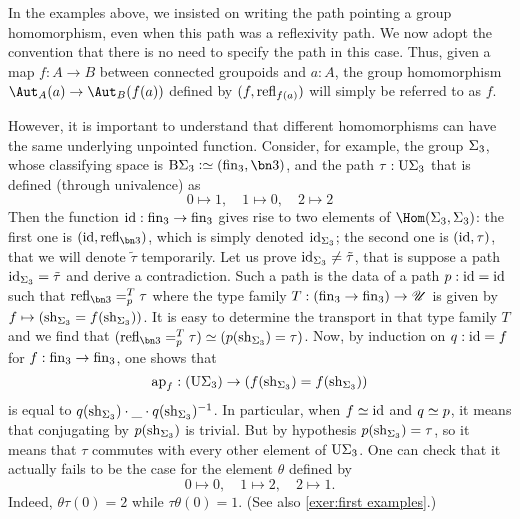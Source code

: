 \begin{remark}
  In the examples above, we insisted on writing the path pointing a group
  homomorphism, even when this path was a reflexivity path. We now adopt
  the convention that there is no need to specify the path in this case. Thus, given a
  map $f:A \to B$ between connected groupoids and $a:A$, the group
  homomorphism $\Aut_A(a) \to \Aut_B(f(a))$ defined by
  $(f,\mathrm{refl}_{f(a)})$ will simply be referred to as $f$.

  However, it is important to understand that different homomorphisms
  can have the same underlying unpointed function. Consider, for
  example, the group $\Sigma_{{3}}$, whose classifying space is
  $\clf \permgrp 3\defequi (\fin_3,\bn 3)$, and the path
  $\tau:\mathrm{U}{\Sigma_{{3}}}$ that is defined (through
  univalence) as
  \begin{displaymath}
    0\mapsto 1,\quad 1\mapsto 0,\quad 2 \mapsto 2
  \end{displaymath}
  Then the function $\id: \fin_3 \to \fin_3$ gives rise to two
  elements of $\Hom(\permgrp 3,\permgrp 3)$: the first one is
  $(\id,\refl{\bn 3})$, which is simply denoted $\mathord{\mathrm{id}}_{\Sigma_{{3}}}$;
  the second one is $(\mathord{\mathrm{id}},\tau)$, that we will denote $\tilde\tau$
  temporarily. Let us prove $\mathord{\mathrm{id}}_{\Sigma_{{3}}} \neq \tilde \tau$, that
  is suppose a path $\mathord{\mathrm{id}}_{\Sigma_{{3}}}= \tilde \tau$ and derive a
  contradiction. Such a path is the data of a path $p:\mathord{\mathrm{id}} = \mathord{\mathrm{id}}$ such
  that $\pathover {\refl{\bn 3}} {T} {p} \tau$ where the type family
  $T:(\fin_3\to\fin_3) \to \UU$ is given by
  $f\mapsto (\mathrm{sh}_{\Sigma_{{3}}} = f(\mathrm{sh}_{\Sigma_{{3}}}))$. It is easy to
  determine the transport in that type family $T$ and we find that
  $(\pathover {\refl{\bn 3}} {T} {p} \tau) \weq (p(\shape_{\permgrp
    3})=\tau)$. Now, by induction on $q:\mathord{\mathrm{id}}=f$ for
  $f:\fin_3 \to \fin_3$, one shows that
  \begin{displaymath}
    \ap f : (\USym{\permgrp 3}) \to
    (f(\shape_{\permgrp 3}) = f(\shape_{\permgrp 3}))
  \end{displaymath}
  is equal to
  $q(\mathrm{sh}_{\Sigma_{{3}}})\cdot {\_}\cdot q(\mathrm{sh}_{\Sigma_{{3}}})^{-1}$. In particular, when $f\jdeq \id$ and $q\jdeq p$, it means
  that conjugating by $p(\mathrm{sh}_{\Sigma_{{3}}})$ is trivial. But by
  hypothesis $p(\mathrm{sh}_{\Sigma_{{3}}}) = \tau$, so it means that $\tau$
  commutes with every other element of
  $\mathrm{U}{\Sigma_{{3}}}$. One can check that it
  actually fails to be the case for the element $\theta$ defined by
  \begin{displaymath}
    0\mapsto 0,\quad 1\mapsto 2,\quad 2\mapsto 1 .
  \end{displaymath}
  Indeed, $\theta\tau(0) = 2$ while $\tau\theta(0) = 1$. (See also
  \cref{exer:first examples}.)
\end{remark}

